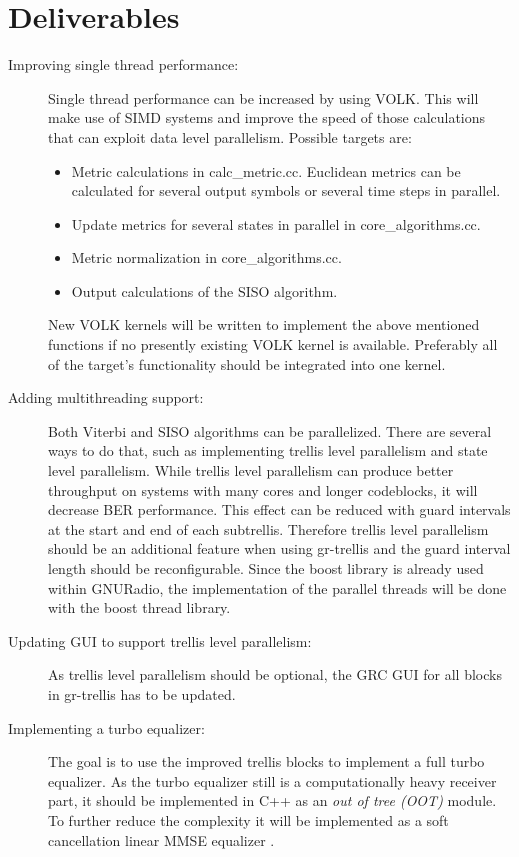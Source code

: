 \documentclass[11pt,		%
	    DIV12,		%
	    a4paper,		%
	    final,		%
	    halfparskip,	%
	    ]{scrartcl}		%
\begin{document}
\section{Deliverables}
\begin{description}
  \item[Improving single thread performance:] Single thread performance can be increased by using VOLK. This will make use of SIMD systems and improve the speed of those calculations that can exploit data level parallelism. Possible targets are:
  \begin{itemize}
        \item Metric calculations in calc\_metric.cc. Euclidean metrics can be calculated for several output symbols or several time steps in parallel. 
        \item Update metrics for several states in parallel in core\_algorithms.cc.  
        \item Metric normalization in core\_algorithms.cc.
        \item Output calculations of the SISO algorithm.
  \end{itemize}  
New VOLK kernels will be written to implement the above mentioned functions if no presently existing VOLK kernel is available. Preferably all of the target's functionality should be integrated into one kernel.    
  \item[Adding multithreading support:] Both Viterbi and SISO algorithms can be parallelized. There are several ways to do that, such as implementing trellis level parallelism and state level parallelism. While trellis level parallelism can produce  better throughput on systems with many cores and longer codeblocks, it will decrease BER performance. This effect can be reduced with guard intervals at the start and end of each subtrellis. Therefore trellis level parallelism should be an additional feature when using gr-trellis and the guard interval length should be reconfigurable. Since the boost library is already used within GNURadio, the implementation of the parallel threads will be done with the boost thread library.    
  \item[Updating GUI to support trellis level parallelism:] As trellis level parallelism should be optional, the GRC GUI for all blocks in gr-trellis has to be updated.
  \item[Implementing a turbo equalizer:] The goal is to use the improved trellis blocks to implement a full turbo equalizer. As the turbo equalizer still is a computationally heavy receiver part, it should be implemented in C++ as an \textit{out of tree (OOT)} module. To further reduce the complexity it will be implemented as a soft cancellation linear MMSE equalizer \cite{te02}.    
\end{description}   
\end{document}
